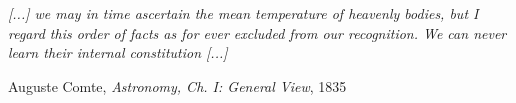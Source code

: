 \begin{intro}





\vspace{1em}
\hfill{}
\begin{minipage}{9cm}{
\begin{spacing}{0.9}
\small
\noindent
\textit{[...] we may in time ascertain the mean temperature of heavenly bodies, but I regard this order of facts as for ever excluded from our recognition. We can never learn their internal constitution [...]}
\end{spacing}
\vspace{1em}
\hfill{}{Auguste Comte, \textit{Astronomy, Ch. I: General View}, 1835}
}
\vspace{2em}
\end{minipage}


\end{intro}
